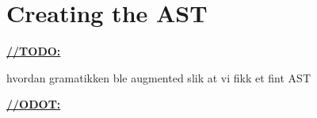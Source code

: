 \section{Creating the AST}
\underline{\textbf{\LARGE //TODO:}}

hvordan gramatikken ble augmented slik at vi fikk et fint AST

\underline{\textbf{\LARGE //ODOT:}}